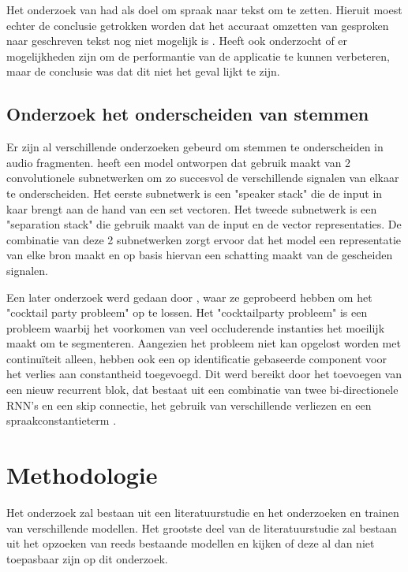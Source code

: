 Het onderzoek van \textcite{Schryver2024} had als doel om spraak naar tekst om te zetten. Hieruit moest echter de conclusie getrokken worden dat het accuraat omzetten van gesproken naar geschreven tekst nog niet mogelijk is \autocite{Schryver2024}. \textcite{Schryver2024} Heeft ook onderzocht of er mogelijkheden zijn om de performantie van de applicatie te kunnen verbeteren, maar de conclusie was dat dit niet het geval lijkt te zijn.

\subsection{Onderzoek het onderscheiden van stemmen}

Er zijn al verschillende onderzoeken gebeurd om stemmen te onderscheiden in audio fragmenten. \textcite{Zeghidour2021} heeft een model ontworpen dat gebruik maakt van 2 convolutionele subnetwerken om zo succesvol de verschillende signalen van elkaar te onderscheiden. Het eerste subnetwerk is een "speaker stack" die de input in kaar brengt aan de hand van een set vectoren. Het tweede subnetwerk is een "separation stack" die gebruik maakt van de input en de vector representaties. De combinatie van deze 2 subnetwerken zorgt ervoor dat het model een representatie van elke bron maakt en op basis hiervan een schatting maakt van de gescheiden signalen. \autocite{Zeghidour2021}

Een later onderzoek werd gedaan door \textcite{Nachmani2020}, waar ze geprobeerd hebben om het "cocktail party probleem" op te lossen. Het "cocktailparty probleem" is een probleem waarbij het voorkomen van veel occluderende instanties het moeilijk maakt om te segmenteren. Aangezien het probleem niet kan opgelost worden met continuïteit alleen, hebben \textcite{Nachmani2020} ook een op identificatie gebaseerde component voor het verlies aan constantheid toegevoegd. Dit werd bereikt door het toevoegen van een nieuw recurrent blok, dat bestaat uit een combinatie van twee bi-directionele RNN's en een skip connectie, het gebruik van verschillende verliezen en een spraakconstantieterm \autocite{Nachmani2020}.

\section{Methodologie}%
\label{sec:methodologie}

Het onderzoek zal bestaan uit een literatuurstudie en het onderzoeken en trainen van verschillende modellen. Het grootste deel van de literatuurstudie zal bestaan uit het opzoeken van reeds bestaande modellen en kijken of deze al dan niet toepasbaar zijn op dit onderzoek.

